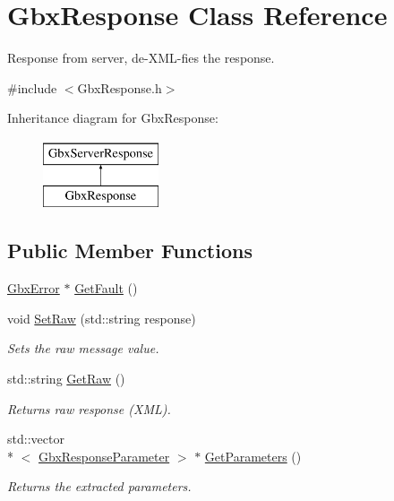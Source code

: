 \hypertarget{classGbxResponse}{\section{Gbx\-Response Class Reference}
\label{classGbxResponse}
}


Response from server, de-\/\-X\-M\-L-\/fies the response.  




{\ttfamily \#include $<$Gbx\-Response.\-h$>$}

Inheritance diagram for Gbx\-Response\-:\begin{figure}[H]
\begin{center}
\leavevmode
\includegraphics[height=2.000000cm]{classGbxResponse}
\end{center}
\end{figure}
\subsection*{Public Member Functions}
\begin{DoxyCompactItemize}
\item 
\hyperlink{structGbxError}{Gbx\-Error} $\ast$ \hyperlink{classGbxResponse_aaeb8f1ccd18ab88799d93ea78befc0df}{Get\-Fault} ()
\item 
void \hyperlink{classGbxResponse_aaf63a008c45be79f900e1131d0fb5565}{Set\-Raw} (std\-::string response)
\begin{DoxyCompactList}\small\item\em Sets the raw message value. \end{DoxyCompactList}\item 
std\-::string \hyperlink{classGbxServerResponse_aa449d9a63899e1d1205e6ab916798ba6}{Get\-Raw} ()
\begin{DoxyCompactList}\small\item\em Returns raw response (X\-M\-L). \end{DoxyCompactList}\item 
std\-::vector\\*
$<$ \hyperlink{classGbxResponseParameter}{Gbx\-Response\-Parameter} $>$ $\ast$ \hyperlink{classGbxServerResponse_ab791b8d9edb964b909d3c70753549668}{Get\-Parameters} ()
\begin{DoxyCompactList}\small\item\em Returns the extracted parameters. \end{DoxyCompactList}\end{DoxyCompactItemize}
